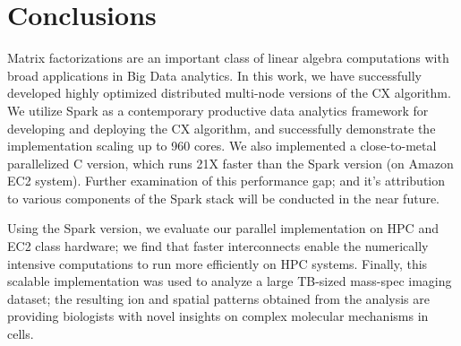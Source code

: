 \section{Conclusions}
\label{sec:conclusion}

Matrix factorizations are an important class of linear algebra computations
with broad applications in Big Data analytics. In this work, we have
successfully developed highly optimized distributed multi-node
versions of the CX algorithm.
We utilize
Spark as a contemporary productive data analytics framework for developing and deploying
the CX algorithm, and successfully demonstrate the implementation scaling up to
960 cores. 
We also implemented a close-to-metal parallelized C version, which runs 21X
faster than the Spark version (on Amazon EC2 system). Further examination of this performance gap; and it's attribution to various components of the Spark stack will be conducted in the near future. 

Using the Spark version, we evaluate our parallel implementation on HPC and EC2 class
hardware; we find that faster interconnects enable the numerically intensive
computations to run more efficiently on HPC systems. Finally, this scalable
implementation was used to analyze a large TB-sized mass-spec imaging
dataset; the resulting ion and spatial patterns obtained from the analysis are
providing biologists with novel insights on complex molecular mechanisms in
cells. 

